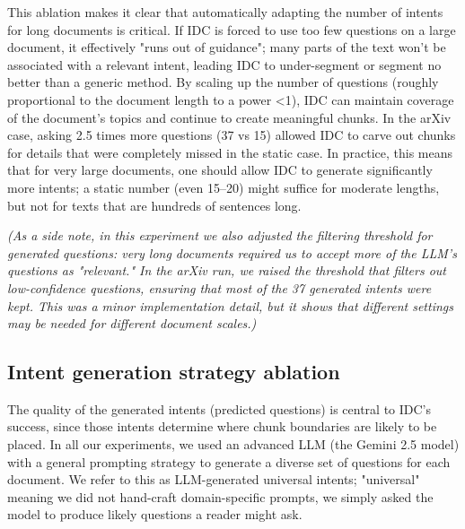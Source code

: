 \documentclass[12pt,a4paper]{report}
\begin{document}
This ablation makes it clear that automatically adapting the number of intents for long documents is critical. If IDC is forced to use too few questions on a large document, it effectively "runs out of guidance"; many parts of the text won't be associated with a relevant intent, leading IDC to under-segment or segment no better than a generic method. By scaling up the number of questions (roughly proportional to the document length to a power <1), IDC can maintain coverage of the document's topics and continue to create meaningful chunks. In the arXiv case, asking 2.5 times more questions (37 vs 15) allowed IDC to carve out chunks for details that were completely missed in the static case. In practice, this means that for very large documents, one should allow IDC to generate significantly more intents; a static number (even 15--20) might suffice for moderate lengths, but not for texts that are hundreds of sentences long.

\textit{(As a side note, in this experiment we also adjusted the filtering threshold for generated questions: very long documents required us to accept more of the LLM's questions as "relevant." In the arXiv run, we raised the threshold that filters out low-confidence questions, ensuring that most of the 37 generated intents were kept. This was a minor implementation detail, but it shows that different settings may be needed for different document scales.)}

\subsection{Intent generation strategy ablation}\label{sec:intent-strategy-ablation}

The quality of the generated intents (predicted questions) is central to IDC's success, since those intents determine where chunk boundaries are likely to be placed. In all our experiments, we used an advanced LLM (the Gemini 2.5 model) with a general prompting strategy to generate a diverse set of questions for each document. We refer to this as LLM-generated universal intents; "universal" meaning we did not hand-craft domain-specific prompts, we simply asked the model to produce likely questions a reader might ask.
\end{document}
